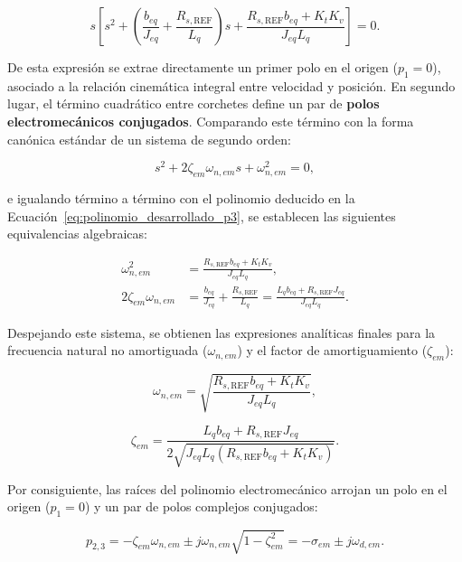 \documentclass[10pt,a4paper]{article}
\begin{document}
\begin{equation}
    s \left[ s^2 + \left( \frac{b_{eq}}{J_{eq}} + \frac{R_{s,\mathrm{REF}}}{L_q} \right) s + \frac{R_{s,\mathrm{REF}} b_{eq} + K_t K_v}{J_{eq} L_q} \right] = 0.
    \label{eq:polinomio_desarrollado_p3}
\end{equation}

De esta expresión se extrae directamente un primer polo en el origen ($p_1 = 0$), asociado a la relación cinemática integral entre velocidad y posición. 
En segundo lugar, el término cuadrático entre corchetes define un par de \textbf{polos electromecánicos conjugados}. 
Comparando este término con la forma canónica estándar de un sistema de segundo orden:

\begin{equation*}
    s^2 + 2\zeta_{em}\omega_{n,em}s + \omega_{n,em}^2 = 0,
\end{equation*}

e igualando término a término con el polinomio deducido en la Ecuación~\eqref{eq:polinomio_desarrollado_p3}, 
se establecen las siguientes equivalencias algebraicas:

\begin{align*}
    \omega_{n,em}^2 &= \frac{R_{s,\mathrm{REF}} b_{eq} + K_t K_v}{J_{eq} L_q}, \\[2mm]
    2\zeta_{em}\omega_{n,em} &= \frac{b_{eq}}{J_{eq}} + \frac{R_{s,\mathrm{REF}}}{L_q} = \frac{L_q b_{eq} + R_{s,\mathrm{REF}} J_{eq}}{J_{eq} L_q}.
\end{align*}

Despejando este sistema, se obtienen las expresiones analíticas finales para la frecuencia natural no amortiguada ($\omega_{n,em}$) 
y el factor de amortiguamiento ($\zeta_{em}$):

\begin{equation}
    \omega_{n,em} = \sqrt{\frac{R_{s,\mathrm{REF}} b_{eq} + K_t K_v}{J_{eq} L_q}},
    \label{eq:wn_em_p3}
\end{equation}

\begin{equation}
    \zeta_{em} = \frac{L_q b_{eq} + R_{s,\mathrm{REF}} J_{eq}}{2 \sqrt{J_{eq} L_q (R_{s,\mathrm{REF}} b_{eq} + K_t K_v)}}.
    \label{eq:zeta_em_p3}
\end{equation}

Por consiguiente, las raíces del polinomio electromecánico arrojan un polo en el origen ($p_1 = 0$) y un par de polos complejos conjugados:

\begin{equation}
    p_{2,3} = -\zeta_{em}\omega_{n,em} \pm j \omega_{n,em}\sqrt{1-\zeta_{em}^2} = -\sigma_{em} \pm j\omega_{d,em}.
\end{equation}
\end{document}

